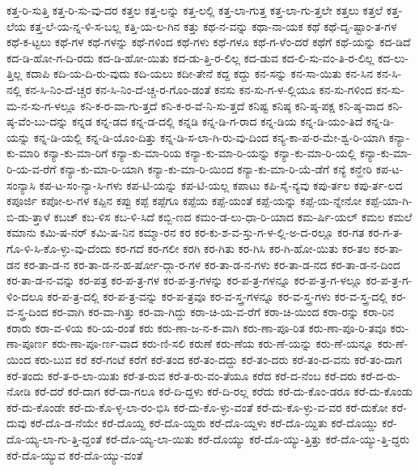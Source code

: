 {ಕತ್ತ-ರಿ-ಸುತ್ತಿ
ಕತ್ತ-ರಿ-ಸು-ವು-ದರ
ಕತ್ತಲ
ಕತ್ತ-ಲನ್ನು
ಕತ್ತ-ಲಲ್ಲಿ
ಕತ್ತ-ಲಾ-ಗುತ್ತ
ಕತ್ತ-ಲಾ-ಗು-ತ್ತಲೇ
ಕತ್ತಲು
ಕತ್ತಲೆ
ಕತ್ತ-ಲೆಯ
ಕತ್ತ-ಲೆ-ಯ-ನ್ನ-ಳಿ-ಸ-ಬಲ್ಲ
ಕತ್ತಿ-ಯ-ಲ-ಗಿನ
ಕತ್ತು
ಕಥ-ನ-ವನ್ನು
ಕಥಾ-ನಾ-ಯಕ
ಕಥೆ
ಕಥೆ-ದೃ-ಷ್ಟಾಂ-ತ-ಗಳ
ಕಥೆ-ಕ-ಟ್ಟಲು
ಕಥೆ-ಗಳ
ಕಥೆ-ಗಳನ್ನು
ಕಥೆ-ಗಳಿಂದ
ಕಥೆ-ಗಳು
ಕಥೆ-ಗಳೂ
ಕಥೆ-ಗ-ಳೆಂ-ದರೆ
ಕಥೆಗೆ
ಕಥೆ-ಯನ್ನು
ಕದ-ಡಿದೆ
ಕದ-ಡಿ-ಹೋ-ಗ-ದಿ-ರದು
ಕದ-ಡಿ-ಹೋ-ಯಿತು
ಕದ-ಡು-ತ್ತಿ-ರ-ಲಿಲ್ಲ
ಕದ-ಡುವ
ಕದ-ಲಿ-ಸು-ವಂ-ತಿ-ರ-ಲಿಲ್ಲ
ಕದ-ಲು-ತ್ತಿಲ್ಲ
ಕದಾಪಿ
ಕದಿ-ಯ-ದಿ-ರು-ವುದು
ಕದಿ-ಯಲು
ಕದೀ-ತೇನೆ
ಕದ್ದ
ಕದ್ದು
ಕನ-ಸನ್ನು
ಕನ-ಸಾ-ಯಿತು
ಕನ-ಸಿನ
ಕನ-ಸಿ-ನಲ್ಲಿ
ಕನ-ಸಿ-ನಿಂ-ದೆ-ಚ್ಚರ
ಕನ-ಸಿ-ನಿಂ-ದೆ-ಚ್ಚ-ರ-ಗೊಂ-ಡಂತೆ
ಕನಸು
ಕನ-ಸು-ಗ-ಳ-ಲ್ಲಿಯೂ
ಕನ-ಸು-ಗಳಿಂದ
ಕನ-ಸು-ಮ-ನ-ಸು-ಗ-ಳಲ್ಲೂ
ಕನಿ-ಕ-ರ-ವಾ-ಗು-ತ್ತದೆ
ಕನಿ-ಕ-ರ-ವೆ-ನಿ-ಸು-ತ್ತದೆ
ಕನಿಷ್ಟ
ಕನಿಷ್ಠ
ಕನಿ-ಷ್ಠ-ಪಕ್ಷ
ಕನಿ-ಷ್ಠ-ವಾದ
ಕನಿ-ಷ್ಠ-ವೆಂ-ಬು-ದನ್ನು
ಕನ್ನಡ
ಕನ್ನ-ಡದ
ಕನ್ನ-ಡ-ದಲ್ಲಿ
ಕನ್ನಡಿ
ಕನ್ನ-ಡಿ-ಗ-ರಾದ
ಕನ್ನ-ಡಿಯ
ಕನ್ನ-ಡಿ-ಯಂ-ತಿದೆ
ಕನ್ನ-ಡಿ-ಯನ್ನು
ಕನ್ನ-ಡಿ-ಯಲ್ಲಿ
ಕನ್ನ-ಡಿ-ಯೊಂ-ದಿತ್ತು
ಕನ್ನ-ಡಿ-ಸ-ಲಾ-ಗಿ-ರು-ವು-ದಿಂದ
ಕನ್ಯ-ಕಾ-ಪ-ರ-ಮೇ-ಶ್ವ-ರಿ-ಯಾಗಿ
ಕನ್ಯಾ-ಕು-ಮಾರಿ
ಕನ್ಯಾ-ಕು-ಮಾ-ರಿಗೆ
ಕನ್ಯಾ-ಕು-ಮಾ-ರಿಯ
ಕನ್ಯಾ-ಕು-ಮಾ-ರಿ-ಯನ್ನು
ಕನ್ಯಾ-ಕು-ಮಾ-ರಿ-ಯಲ್ಲಿ
ಕನ್ಯಾ-ಕು-ಮಾ-ರಿ-ಯ-ವ-ರೆಗೆ
ಕನ್ಯಾ-ಕು-ಮಾ-ರಿ-ಯಾಗಿ
ಕನ್ಯಾ-ಕು-ಮಾ-ರಿ-ಯಿಂದ
ಕನ್ಯಾ-ಕು-ಮಾ-ರಿ-ಯೆ-ಡೆಗೆ
ಕನ್ಯೆ
ಕನ್ಹೇರಿ
ಕಪ-ಟ-ಸಂನ್ಯಾಸಿ
ಕಪ-ಟ-ಸಂ-ನ್ಯಾ-ಸಿ-ಗಳು
ಕಪ-ಟಿ-ಯನ್ನು
ಕಪ-ಟಿ-ಯಲ್ಲ
ಕಪಾಟು
ಕಪಿ-ಸೈ-ನ್ಯವು
ಕಪು-ರ್ತಲ
ಕಪು-ರ್ತ-ಲದ
ಕಪೂರ್ಜಿ
ಕಪೋ-ಲ-ಗಳ
ಕಪ್ಪಿನ
ಕಪ್ಪು
ಕಪ್ಪೆ
ಕಪ್ಪೆಗೂ
ಕಪ್ಪೆಯ
ಕಪ್ಪೆ-ಯಂತೆ
ಕಪ್ಪೆ-ಯನ್ನು
ಕಪ್ಪೆ-ಯ-ನ್ನೇನೋ
ಕಪ್ಪೆ-ಯಾ-ಗಿ-ಬಿ-ಡು-ತ್ತಾಳೆ
ಕಬಚ್
ಕಬ-ಳಿಸ
ಕಬ-ಳಿ-ಸಿದೆ
ಕಬ್ಬಿ-ಣದ
ಕಮಂ-ಡ-ಲು-ಧಾ-ರಿ-ಯಾದ
ಕಮ-ರ್ಷಿ-ಯಲ್
ಕಮಲ
ಕಮಲೆ
ಕಮಾನು
ಕಮಿ-ಷ-ನರ್
ಕಮಿ-ಷ-ನಿನ
ಕಮ್ಮಾ-ರನ
ಕರ
ಕರ-ಕು-ಶ-ವ-ಸ್ತು-ಗ-ಳ-ಲ್ಲಿ-ಅ-ದ-ರಲ್ಲೂ
ಕರ-ಗತ
ಕರ-ಗ-ತ-ಗೊ-ಳಿ-ಸಿ-ಕೊ-ಳ್ಳು-ವು-ದೆಂದು
ಕರ-ಗದೆ
ಕರ-ಗಲೀ
ಕರಗಿ
ಕರ-ಗಿತು
ಕರ-ಗಿಸಿ
ಕರ-ಗಿ-ಹೋ-ಯಿತು
ಕರ-ತಲ
ಕರ-ತಾ-ಡನ
ಕರ-ತಾ-ಡ-ನ
ಕರ-ತಾ-ಡ-ನ-ಹ-ರ್ಷೋ-ದ್ಗಾ-ರ-ಗಳ
ಕರ-ತಾ-ಡ-ನ-ಗಳು
ಕರ-ತಾ-ಡ-ನದ
ಕರ-ತಾ-ಡ-ನ-ದಿಂದ
ಕರ-ತಾ-ಡ-ನ-ವನ್ನು
ಕರ-ಪತ್ರ
ಕರ-ಪ-ತ್ರ-ಗಳ
ಕರ-ಪ-ತ್ರ-ಗಳನ್ನು
ಕರ-ಪ-ತ್ರ-ಗಳನ್ನೂ
ಕರ-ಪ-ತ್ರ-ಗ-ಳಲ್ಲೂ
ಕರ-ಪ-ತ್ರ-ಗ-ಳಿಂ-ದಲೂ
ಕರ-ಪ-ತ್ರ-ದಲ್ಲಿ
ಕರ-ಪ-ತ್ರ-ವನ್ನು
ಕರ-ಪ-ತ್ರವೂ
ಕರ-ವ-ಸ್ತ್ರ-ಗಳನ್ನೂ
ಕರ-ವ-ಸ್ತ್ರ-ಗಳು
ಕರ-ವ-ಸ್ತ್ರ-ದಲ್ಲಿ
ಕರ-ವ-ಸ್ತ್ರ-ದಿಂದ
ಕರ-ವಾಗಿ
ಕರ-ವಾ-ಗಿತ್ತು
ಕರ-ವಾ-ಗಿದ್ದು
ಕರಾ-ಚಿ-ಯ-ವ-ರೆಗೆ
ಕರಾ-ಚಿ-ಯಿಂದ
ಕರಾ-ರನ್ನು
ಕರಾ-ರಿನ
ಕರಾರು
ಕರಾ-ವ-ಳಿಯ
ಕರಿ-ಯ-ರಂತೆ
ಕರು
ಕರು-ಣಾ-ಜ-ನ-ಕ-ವಾಗಿ
ಕರು-ಣಾ-ಪೂ-ರಿತ
ಕರು-ಣಾ-ಪೂ-ರಿ-ತವೂ
ಕರು-ಣಾ-ಪೂರ್ಣ
ಕರು-ಣಾ-ಪೂ-ರ್ಣ-ವಾದ
ಕರು-ಣಿ-ಸಲಿ
ಕರುಣೆ
ಕರು-ಣೆಯ
ಕರು-ಣೆ-ಯನ್ನು
ಕರು-ಣೆ-ಯನ್ನೂ
ಕರು-ಣೆ-ಯಿಂದ
ಕರು-ಬುವ
ಕರೆ
ಕರೆ-ಗಂಟೆ
ಕರೆಗೆ
ಕರೆ-ತಂದ
ಕರೆ-ತಂ-ದದ್ದು
ಕರೆ-ತಂ-ದರು
ಕರೆ-ತಂ-ದ-ವನು
ಕರೆ-ತಂ-ದಾಗ
ಕರೆ-ತಂದು
ಕರೆ-ತ-ರ-ಲಾ-ಯಿತು
ಕರೆ-ತ-ರುವ
ಕರೆ-ತ-ರು-ವಂ-ತೆಯೂ
ಕರೆದ
ಕರೆ-ದ-ನೆಂಬ
ಕರೆ-ದರು
ಕರೆ-ದ-ರು-ನೋಡಿ
ಕರೆ-ದರೆ
ಕರೆ-ದಾಗ
ಕರೆ-ದಾ-ಗಲೂ
ಕರೆ-ದಿ-ದ್ದಳು
ಕರೆ-ದಿ-ರಲ್ಲ
ಕರೆದು
ಕರೆ-ದು-ಕೊಂ-ಡರೂ
ಕರೆ-ದು-ಕೊಂಡು
ಕರೆ-ದು-ಕೊಂಡೇ
ಕರೆ-ದು-ಕೊ-ಳ್ಳ-ಲಾ-ರಂ-ಭಿಸಿ
ಕರೆ-ದು-ಕೊ-ಳ್ಳು-ವಂತೆ
ಕರೆ-ದು-ಕೊ-ಳ್ಳು-ವ-ವರ
ಕರೆ-ದುಕೋ
ಕರೆ-ದುವು
ಕರೆ-ದೊ-ಡ-ನೆಯೇ
ಕರೆ-ದೊಯ್ದ
ಕರೆ-ದೊ-ಯ್ದರು
ಕರೆ-ದೊ-ಯ್ದಳು
ಕರೆ-ದೊ-ಯ್ದಿತು
ಕರೆ-ದೊಯ್ದು
ಕರೆ-ದೊ-ಯ್ಯ-ಲಾ-ಗು-ತ್ತಿ-ದ್ದಂತೆ
ಕರೆ-ದೊ-ಯ್ಯ-ಲಾ-ಯಿತು
ಕರೆ-ದೊಯ್ಯು
ಕರೆ-ದೊ-ಯ್ಯು-ತ್ತಿತ್ತು
ಕರೆ-ದೊ-ಯ್ಯು-ತ್ತಿ-ದ್ದರು
ಕರೆ-ದೊ-ಯ್ಯುವ
ಕರೆ-ದೊ-ಯ್ಯು-ವಂತೆ
}
